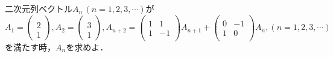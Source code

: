 \documentclass[../../main.tex]{subfiles}
\begin{document}
二次元列ベクトル$A_n\, (n=1,2,3,\cdots)$が
\begin{equation}
  A_1=
  \begin{pmatrix}\\
    2 \\1
  \end{pmatrix},
  A_2=
  \begin{pmatrix}\\
    3 \\1
  \end{pmatrix},
  A_{n+2}=
  \begin{pmatrix}\\
    1 & 1 \\ 1 & -1 \\
  \end{pmatrix}A_{n+1}+
  \begin{pmatrix}\\
    0 & -1 \\ 1 & 0 \\
  \end{pmatrix}A_{n},
  (n=1,2,3,\cdots)
\end{equation}
を満たす時，$A_n$を求めよ．
\end{document}
